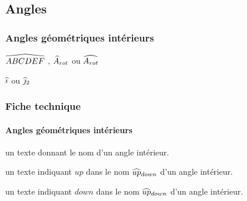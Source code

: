 \documentclass[12pt,a4paper]{article}
\begin{document}

\subsection{Angles}

\subsubsection{Angles géométriques \og intérieurs \fg}

\newparaexample{}

\begin{latexex}
$\anglein{ABCDEF}$ ,
$\anglein*{A}{rot}$ ou
$\anglein{A_{rot}}$
\end{latexex}




\newparaexample{}

\begin{latexex}
$\anglein{i}$ ou
$\anglein*{j}{2}$
\end{latexex}




\subsubsection{Fiche technique}

\paragraph{Angles géométriques \og intérieurs \fg}


\IDarg{} un texte donnant le nom d'un angle intérieur.


\separation



 un texte indiquant $up$ dans le nom $\anglein*{up}{down}$ d'un angle intérieur.

 un texte indiquant $down$ dans le nom $\anglein*{up}{down}$ d'un angle intérieur.
\end{document}
